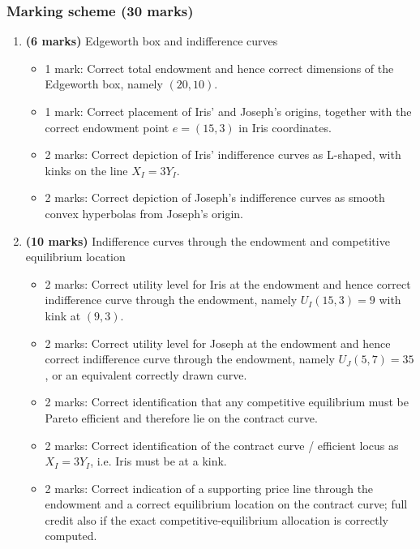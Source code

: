 \documentclass[12pt]{article}
\begin{document}
\subsubsection{Marking scheme (30 marks)}

\begin{enumerate}[label=(\alph*)]
    \item \textbf{(6 marks)} Edgeworth box and indifference curves
    \begin{itemize}
        \item 1 mark: Correct total endowment and hence correct dimensions of the Edgeworth box, namely \((20,10)\).
        \item 1 mark: Correct placement of Iris' and Joseph's origins, together with the correct endowment point \(e=(15,3)\) in Iris coordinates.
        \item 2 marks: Correct depiction of Iris' indifference curves as L-shaped, with kinks on the line \(X_I=3Y_I\).
        \item 2 marks: Correct depiction of Joseph's indifference curves as smooth convex hyperbolas from Joseph's origin.
    \end{itemize}

\newpage
    \item \textbf{(10 marks)} Indifference curves through the endowment and competitive equilibrium location
    \begin{itemize}
        \item 2 marks: Correct utility level for Iris at the endowment and hence correct indifference curve through the endowment, namely \(U_I(15,3)=9\) with kink at \((9,3)\).
        \item 2 marks: Correct utility level for Joseph at the endowment and hence correct indifference curve through the endowment, namely \(U_J(5,7)=35\), or an equivalent correctly drawn curve.
        \item 2 marks: Correct identification that any competitive equilibrium must be Pareto efficient and therefore lie on the contract curve.
        \item 2 marks: Correct identification of the contract curve / efficient locus as \(X_I=3Y_I\), i.e. Iris must be at a kink.
        \item 2 marks: Correct indication of a supporting price line through the endowment and a correct equilibrium location on the contract curve; full credit also if the exact competitive-equilibrium allocation is correctly computed.
    \end{itemize}


\end{enumerate}
\end{document}
